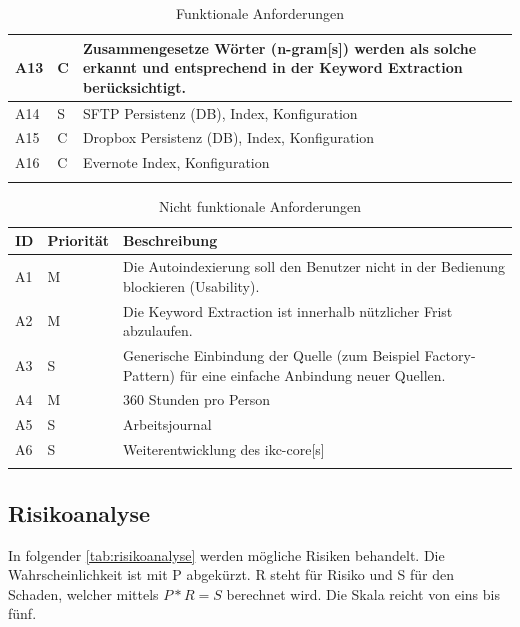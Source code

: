 \begin{longtable}{|p{1.5cm} | p{1.5cm} | p{8.1cm}|}
    A13 & C & Zusammengesetze Wörter (\gls{n-gram}[s]) werden als solche erkannt und entsprechend in der \gls{Keyword Extraction} berücksichtigt. \\\hline
    A14 & S & \gls{SFTP} Persistenz (DB), Index, Konfiguration \\\hline
    A15 & C & \gls{Dropbox} Persistenz (DB), Index, Konfiguration \\\hline
    A16 & C & \gls{Evernote} Index, Konfiguration \\\hline
    \caption{Funktionale Anforderungen}
  \label{tab:funktionale-anforderungen}
\end{longtable}

\begin{longtable}{|p{1.5cm} | p{1.5cm} | p{8.1cm}|}
  \hline
    ID & Priorität & Beschreibung \\\hline
    A1 & M & Die Autoindexierung soll den Benutzer nicht in der Bedienung blockieren (Usability).\\\hline
    A2 & M & Die \gls{Keyword Extraction} ist innerhalb nützlicher Frist abzulaufen. \\\hline
    A3 & S & Generische Einbindung der Quelle (zum Beispiel Factory-Pattern) für eine einfache Anbindung neuer Quellen.\\\hline
    A4 & M  & 360 Stunden pro Person\\\hline
    A5 & S & Arbeitsjournal \\\hline
    A6 & S & Weiterentwicklung des \gls{ikc-core}[s] \\\hline
    \caption{Nicht funktionale Anforderungen}
  \label{tab:nicht-funktionale-anforderungen}
\end{longtable}

\subsection{Risikoanalyse}\label{risikoanalyse}

In folgender \autoref{tab:risikoanalyse} werden mögliche Risiken behandelt. Die Wahrscheinlichkeit ist mit P abgekürzt. R steht für Risiko und S für den Schaden, welcher mittels $P*R=S$ berechnet wird. Die Skala reicht von eins bis fünf.

\clearpage

